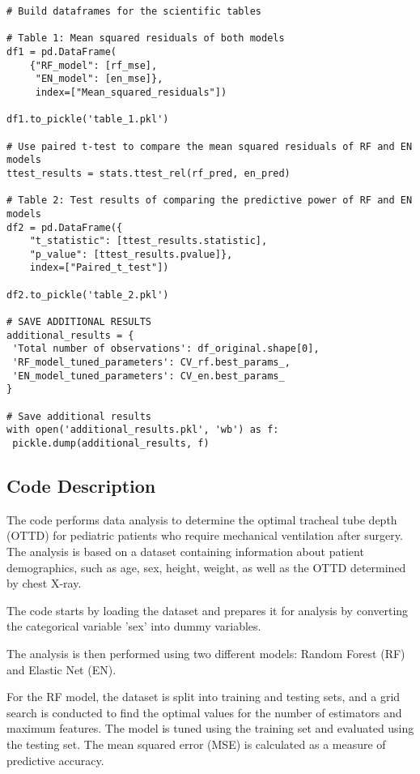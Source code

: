 \documentclass[11pt]{article}
\begin{document}
\begin{verbatim}
# Build dataframes for the scientific tables

# Table 1: Mean squared residuals of both models
df1 = pd.DataFrame(
    {"RF_model": [rf_mse],
     "EN_model": [en_mse]},
     index=["Mean_squared_residuals"])

df1.to_pickle('table_1.pkl')

# Use paired t-test to compare the mean squared residuals of RF and EN models
ttest_results = stats.ttest_rel(rf_pred, en_pred)

# Table 2: Test results of comparing the predictive power of RF and EN models
df2 = pd.DataFrame({
    "t_statistic": [ttest_results.statistic],
    "p_value": [ttest_results.pvalue]},
    index=["Paired_t_test"])

df2.to_pickle('table_2.pkl')
        
# SAVE ADDITIONAL RESULTS
additional_results = {
 'Total number of observations': df_original.shape[0], 
 'RF_model_tuned_parameters': CV_rf.best_params_,
 'EN_model_tuned_parameters': CV_en.best_params_
}

# Save additional results
with open('additional_results.pkl', 'wb') as f:
 pickle.dump(additional_results, f)

\end{verbatim}

\subsection{Code Description}

The code performs data analysis to determine the optimal tracheal tube depth (OTTD) for pediatric patients who require mechanical ventilation after surgery. The analysis is based on a dataset containing information about patient demographics, such as age, sex, height, weight, as well as the OTTD determined by chest X-ray.

The code starts by loading the dataset and prepares it for analysis by converting the categorical variable 'sex' into dummy variables. 

The analysis is then performed using two different models: Random Forest (RF) and Elastic Net (EN). 

For the RF model, the dataset is split into training and testing sets, and a grid search is conducted to find the optimal values for the number of estimators and maximum features. The model is tuned using the training set and evaluated using the testing set. The mean squared error (MSE) is calculated as a measure of predictive accuracy.
\end{document}
